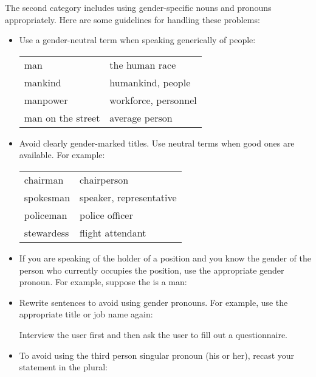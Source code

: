 The second category includes using gender-specific nouns and pronouns
appropriately. Here are some guidelines for handling these
problems:
\begin{itemize}

\item Use a gender-neutral term when speaking generically of people:

\begin{tabular}{ll}
   man                 &   the human race        \\
   mankind             &   humankind, people     \\
   manpower            &   workforce, personnel  \\
   man on the street   &   average person        \\
\end{tabular}


\item Avoid clearly gender-marked titles. Use neutral terms when
good ones are available. For example:

\begin{tabular}{ll}
  chairman     &  chairperson               \\
  spokesman    &  speaker, representative   \\
  policeman    &  police officer            \\
  stewardess   &  flight attendant          \\
\end{tabular}



\item If you are speaking of the holder of a position and you know the
  gender of the person who currently occupies the position, use the
  appropriate gender pronoun.  For example, suppose the 
  is a man:




\item Rewrite sentences to avoid using gender pronouns. For example,
  use the appropriate title or job name again:

{Interview the user first and then ask the user to fill out a questionnaire.}



\item To avoid using the third person singular pronoun (his or her),
  recast your statement in the plural:


\end{itemize}
